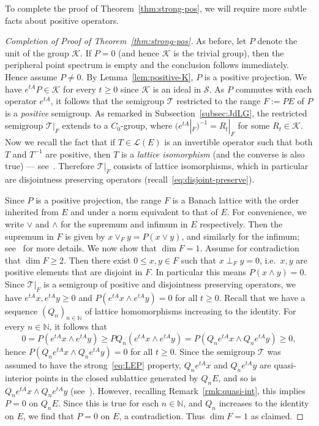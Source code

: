\documentclass[a4paper, reqno]{amsart}
\numberwithin{equation}{section}
\theoremstyle{plain}
\theoremstyle{definition}
\theoremstyle{remark}
\newcommand{\NN}{\mathbb{N}}
\begin{document}
To complete the proof of Theorem~\ref{thm:strong-pos}, we will require more subtle facts about positive operators.
\begin{proof}[Completion of Proof of Theorem~\ref{thm:strong-pos}]
	As before, let $P$ denote the unit of the group $\mathcal{K}$. If $P=0$ (and hence $\mathcal{K}$ is the trivial group), then the peripheral point spectrum is empty and the conclusion follows immediately. Hence assume $P\ne 0$. By Lemma~\ref{lem:positive-K}, $P$ is a positive projection. We have $e^{tA}P\in\mathcal{K}$ for every $t\ge 0$ since $\mathcal{K}$ is an ideal in $\mathcal{S}$. As $P$ commutes with each operator $e^{tA}$, it follows that the semigroup $\mathcal{T}$ restricted to the range $F:=PE$ of $P$ is a \emph{positive} semigroup. As remarked in Subsection~\ref{subsec:JdLG}, the restricted semigroup $\mathcal{T}|_F$ extends to a $C_0$-group, where $(e^{tA}|_F)^{-1}=R_t|_F$ for some $R_t\in\mathcal{K}$. Now we recall the fact that if $T\in\mathcal{L}(E)$ is an invertible operator such that both $T$ and $T^{-1}$ are positive, then $T$ is a \emph{lattice isomorphism} (and the converse is also true) --- see~\cite[Theorem 2.15]{AB}. Therefore $\mathcal{T}|_F$ consists of lattice isomorphisms, which in particular are disjointness preserving operators (recall~\eqref{eq:disjoint-preserve}).
	
	Since $P$ is a positive projection, the range $F$ is a Banach lattice with the order inherited from $E$ and under a norm equivalent to that of $E$. For convenience, we write $\vee$ and $\wedge$ for the supremum and infimum in $E$ respectively. Then the supremum in $F$ is given by $x\vee_F y = P(x\vee y)$, and similarly for the infimum; see~\cite[Chapter III, Proposition 11.5]{Sch} for more details. We now show that $\dim F=1$. Assume for contradiction that $\dim F \ge 2$. Then there exist $0 \le x,y\in F$ such that $x\perp_F y=0$, i.e.\ $x,y$ are positive elements that are disjoint in $F$. In particular this means $P(x\wedge y)=0$. Since $\mathcal{T}|_F$ is a semigroup of positive and disjointness preserving operators, we have $e^{tA}x, e^{tA}y \ge 0$ and $P(e^{tA}x\wedge e^{tA}y)=0$ for all $t\ge 0$. Recall that we have a sequence $(Q_n)_{n\in\NN}$ of lattice homomorphisms increasing to the identity. For every $n\in\NN$, it follows that
	\begin{equation*}
		0 = P(e^{tA}x\wedge e^{tA}y) \ge PQ_n (e^{tA}x\wedge e^{tA}y) = P(Q_n e^{tA}x\wedge Q_n e^{tA}y) \ge 0,
	\end{equation*}
	hence $P(Q_n e^{tA}x\wedge Q_n e^{tA}y)=0$ for all $t\ge 0$. Since the semigroup $\mathcal{T}$ was assumed to have the strong~\eqref{eq:LEP} property, $Q_n e^{tA}x$ and $Q_n e^{tA}y$ are quasi-interior points in the closed sublattice generated by $Q_n E$, and so is $Q_n e^{tA}x\wedge Q_n e^{tA}y$ (see~\cite[Chapter II, Proposition 6.2]{Sch}). However, recalling Remark~\ref{rmk:quasi-int}, this implies $P=0$ on $Q_n E$. Since this is true for each $n\in\NN$, and $Q_n$ increases to the identity on $E$, we find that $P=0$ on $E$, a contradiction. Thus $\dim F=1$ as claimed.
	

\end{proof}
\end{document}
